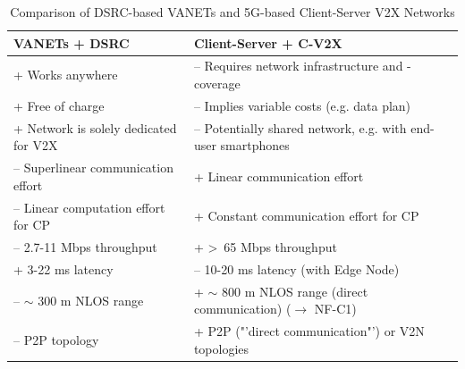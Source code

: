 \begin{table}[H]
	\begin{tabular}{|p{7.6cm}|p{7.6cm}|}
		\hline
		\textbf{VANETs + DSRC}                & \textbf{Client-Server + C-V2X}                                                 \\ \hline
		\rowcolor[HTML]{9AFF99} 
		+ Works anywhere                      & \cellcolor[HTML]{FFCCC9}– Requires network infrastructure and -coverage              \\ \hline
		\rowcolor[HTML]{9AFF99} 
		+ Free of charge                      & \cellcolor[HTML]{FFCCC9}– Implies variable costs (e.g. data plan)                    \\ \hline
		\rowcolor[HTML]{9AFF99} 
		+ Network is solely dedicated for V2X & \cellcolor[HTML]{FFCCC9}– Potentially shared network, e.g. with end-user smartphones \\ \hline
		\rowcolor[HTML]{FFCCC9} 
		– Superlinear communication effort    & \cellcolor[HTML]{9AFF99}+ Linear communication effort                                \\ \hline
		\rowcolor[HTML]{FFCCC9} 
		– Linear computation effort for CP    & \cellcolor[HTML]{9AFF99}+ Constant communication effort for CP                       \\ \hline
		\rowcolor[HTML]{FFCCC9} 
		– 2.7-11 Mbps throughput \cite{Chen2016, Wang2013}              & \cellcolor[HTML]{9AFF99}+ \textgreater \ 65 Mbps throughput \cite{Kavanagh2019, wiki:5g}                          \\ \hline
		\rowcolor[HTML]{9AFF99} 
		+ 3-22 ms latency \cite{Rauch2011}                     & \cellcolor[HTML]{FFCCC9}– 10-20 ms latency (with Edge Node) \cite{wiki:5g, QualcommTechnologiesInc.2018}                          \\ \hline
		\rowcolor[HTML]{FFCCC9} 
		– $\sim$ 300 m NLOS range \cite{5GAutomotiveAssociation2018}              & \cellcolor[HTML]{9AFF99}+ $\sim$ 800 m NLOS range (direct communication) \cite{5GAutomotiveAssociation2018} ($\rightarrow$ NF-C1)                                     \\ \hline
		\rowcolor[HTML]{FFCCC9} 
		– P2P topology                        & \cellcolor[HTML]{9AFF99}+ P2P ("'direct communication"') or V2N topologies             \\ \hline            
	\end{tabular}
	\caption{Comparison of DSRC-based VANETs and 5G-based Client-Server V2X Networks}
	\label{tab:5g_dsrc_comparison}
\end{table}

